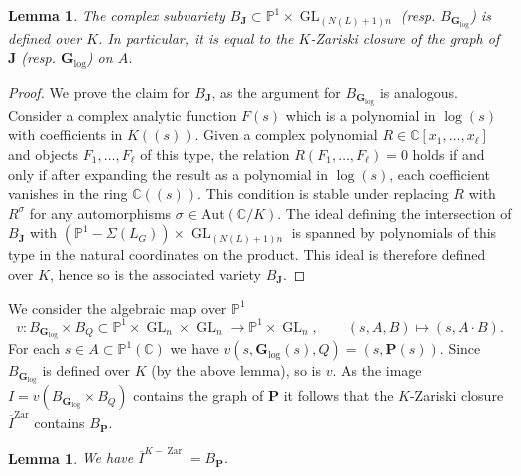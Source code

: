 \documentclass[10pt]{article}
\numberwithin{equation}{section}
\theoremstyle{plain}
\newtheorem{lem}[thm]{Lemma}
\theoremstyle{definition}
\theoremstyle{remark}
\newcommand{\david}[1]{{\color{brown} \sf   David: [#1]}}
\newcommand{\GL}{\operatorname{GL}}
\newcommand{\PP}{\mathbb{P}}
\begin{document}
\begin{lem}\label{lemdefoverK} 
The complex subvariety $B_{\mathbf{J}} \subset \mathbb{P}^1 \times \GL_{(N(L) + 1) n}$ (resp. $B_{\mathbf{G}_{\operatorname{log}}}$) is defined over $K$. In particular, it is equal to the $K$-Zariski closure of the graph of $\mathbf{J}$ (resp. $\mathbf{G}_{\operatorname{log}}$) on $A$.
\end{lem}
\begin{proof}
We prove the claim for $B_{\mathbf{J}}$, as the argument for $B_{\mathbf{G}_{\operatorname{log}}}$ is analogous. Consider a complex analytic function $F(s)$ which is a polynomial in $\log(s)$ with coefficients in $K((s))$. Given a complex polynomial $R \in \mathbb{C}[x_{1}, \hdots, x_{\ell}]$ and objects $F_{1}, \hdots, F_{\ell}$ of this type, the relation $R(F_{1}, \hdots, F_{\ell}) = 0$ holds if and only if after expanding the result as a polynomial in $\log(s)$, each coefficient vanishes in the ring $\mathbb{C}((s))$. This condition is stable under replacing $R$ with $R^{\sigma}$ for any automorphisms $\sigma \in \textrm{Aut}(\mathbb{C}/K)$. The ideal defining the intersection of $B_{\mathbf{J}}$ with $(\mathbb{P}^1 - \Sigma(L_{G})) \times \GL_{(N(L)+1)n}$ is spanned by polynomials of this type in the natural coordinates on the product. This ideal is therefore defined over $K$, hence so is the associated variety $B_{\mathbf{J}}$.
\end{proof}

 
We consider the algebraic map over $\mathbb{P}^1$
\begin{displaymath}
    v : B_{\mathbf{G}_{\operatorname{log}}} \times B_{Q} \subset \mathbb{P}^1 \times \GL_{n} \times \GL_{n} \to \mathbb{P}^1 \times \GL_{n}, \hspace{2em} (s, A, B) \mapsto (s, A \cdot B) .
\end{displaymath}
For each $s \in A\subset \PP^1(\mathbb{C})$ we have $v(s, \mathbf{G}_{\operatorname{log}}(s), Q) = (s, \mathbf{P}(s))$. Since  $B_{\mathbf{G}_{\operatorname{log}}}$ is defined over $K$ (by the above lemma), so is $v$. As the image $I = v(B_{\mathbf{G}_{\operatorname{log}}} \times B_{Q})$ contains the graph of $\mathbf{P}$ it follows that the $K$-Zariski closure $\overline{I}^{\textrm{Zar}}$ contains $B_{\mathbf{P}}$. 

\begin{lem}
We have $\overline{I}^{K-\operatorname{Zar}} = B_{\mathbf{P}}$.
\end{lem}
\end{document}
